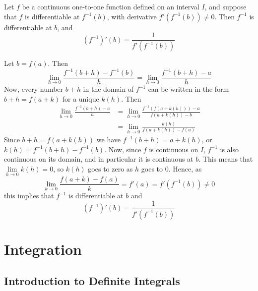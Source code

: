 \documentclass[12pt]{report}
\begin{document}
\begin{thm}{}{}
    Let $f$ be a continuous one-to-one function defined on an interval $I$, and suppose that $f$ is differentiable at $f^{-1}(b)$, with derivative $f'(f^{-1}(b)) \neq 0$. Then $f^{-1}$ is differentiable at $b$, and \begin{equation}
        (f^{-1})'(b) = \frac{1}{f'(f^{-1}(b))}
    \end{equation}
\end{thm}
\begin{proof*}{}{}
    Let $b = f(a)$. Then \begin{equation*}
        \lim\limits_{h\rightarrow 0}\frac{f^{-1}(b+h)-f^{-1}(b)}{h} = \lim\limits_{h\rightarrow 0}\frac{f^{-1}(b+h) - a}{h}
    \end{equation*}
    Now, every number $b+h$ in the domain of $f^{-1}$ can be written in the form $b+h = f(a+k)$ for a unique $k(h)$. Then \begin{align*}
        \lim\limits_{h\rightarrow 0}\frac{f^{-1}(b+h) - a}{h} &= \lim\limits_{h\rightarrow 0}\frac{f^{-1}(f(a+k(h)))-a}{f(a+k(h))-b} \\
        &= \lim\limits_{h\rightarrow 0}\frac{k(h)}{f(a+k(h))-f(a)}
    \end{align*}
    Since $b+h = f(a+k(h))$ we have $f^{-1}(b+h) = a+k(h)$, or $k(h) = f^{-1}(b+h)-f^{-1}(b)$. Now, since $f$ is continuous on $I$, $f^{-1}$ is also continuous on its domain, and in particular it is continuous at $b$. This means that $\lim\limits_{h\rightarrow 0}k(h) = 0$, so $k(h)$ goes to zero as $h$ goes to $0$. Hence, as $$\lim\limits_{k\rightarrow 0}\frac{f(a+k)-f(a)}{k} = f'(a) = f'(f^{-1}(b)) \neq 0$$ this implies that $f^{-1}$ is differentiable at $b$ and \begin{equation*}
        (f^{-1})'(b) = \frac{1}{f'(f^{-1}(b))}
    \end{equation*}
\end{proof*}






\chapter{Integration}

\section{Introduction to Definite Integrals}
\end{document}
